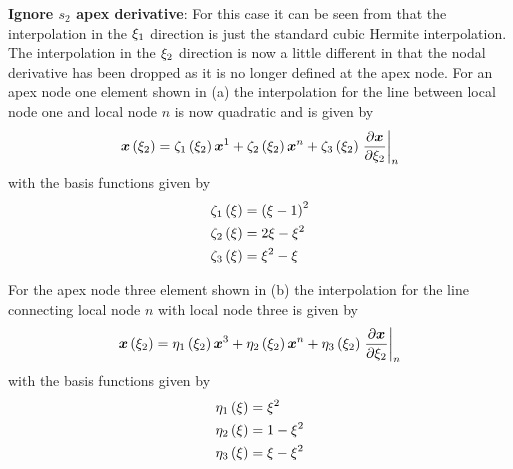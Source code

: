 \textbf{Ignore $s_{2}$ apex derivative}: For this case it can be seen from
 that the interpolation in the $\xi_{1}$ direction
is just the standard cubic Hermite interpolation. The interpolation in the
$\xi_{2}$ direction is now a little different in that the nodal \arclen
derivative has been dropped as it is no longer defined at the apex node.  For
an apex node one element shown in (a) the
interpolation for the line between local node one and local node $n$ is now
quadratic and is given by
\begin{equation}
  \fnof{\vect{x}}{\xitwo}=\hsonebfn{1}{\xitwo}\nodept{\vect{x}}{1}+
  \hsonebfn{2}{\xitwo}\nodept{\vect{x}}{n}+
  \hsonebfn{3}{\xitwo}\evalat{\delby{\vect{x}}{\xitwo}}{n}
  \label{eqn:hsapex1xiinterp}
\end{equation}
with the basis functions given by
\begin{equation}
  \begin{split}
       \zeta_{1} \left( \xi \right)  &=\left( \xi-1 \right)^{2} \\ 
       \zeta_{2} \left( \xi \right)  &=2\xi-\xi^{2} \\
       \zeta_{3} \left( \xi \right)  &=\xi^{2}-\xi
  \end{split}
  \label{eqn:hsapex1bfuns}
\end{equation}

For the apex node three element shown in (b) the
interpolation for the line connecting local node $n$ with local node three is
given by
\begin{equation}
  \fnof{\vect{x}}{\xitwo}=\hsthreebfn{1}{\xitwo}\nodept{\vect{x}}{3}+
  \hsthreebfn{2}{\xitwo}\nodept{\vect{x}}{n}+
  \hsthreebfn{3}{\xitwo}\evalat{\delby{\vect{x}}{\xitwo}}{n}
  \label{eqn:hsapex3xiinterp}
\end{equation}
with the basis functions given by
\begin{equation}
  \begin{split}
       \eta_{1} \left( \xi \right)  &=\xi^{2} \\ 
       \eta_{2} \left( \xi \right)  &=1-\xi^{2} \\ 
       \eta_{3} \left( \xi \right)  &=\xi-\xi^{2}
  \end{split}
  \label{eqn:hsapex3Bfuns}
\end{equation}
 
